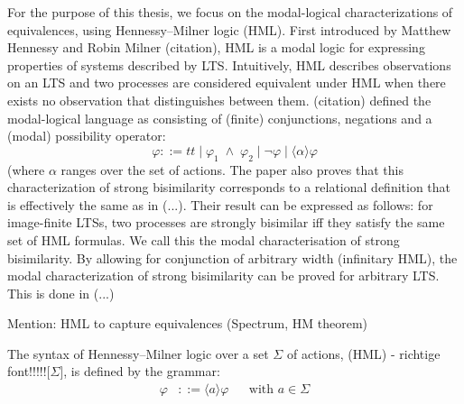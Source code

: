 %
\begin{isabellebody}%
%
%
\isadelimtheory
%
\endisadelimtheory
%
\isatagtheory
%
\endisatagtheory
{\isafoldtheory}%
%
\isadelimtheory
%
\endisadelimtheory
%
\isadelimdocument
%
\endisadelimdocument
%
\isatagdocument
%
\isamarkuptrue%
%
\endisatagdocument
{\isafolddocument}%
%
\isadelimdocument
%
\endisadelimdocument
%
\begin{isamarkuptext}%
For the purpose of this thesis, we focus on the modal-logical characterizations of equivalences, using Hennessy--Milner logic (HML). 
First introduced by Matthew Hennessy and Robin Milner (citation), HML is a modal logic for expressing properties of systems described by LTS.
Intuitively, HML describes observations on an LTS and two processes are considered equivalent under HML when there exists no observation that distinguishes between them.
(citation) defined the modal-logical language as consisting of (finite) conjunctions, negations and a (modal) possibility operator:
$$\varphi ::= t\!t \mid \varphi_1 \;\wedge\; \varphi_2 \mid \neg\varphi \mid \langle\alpha\rangle\varphi$$
(where $\alpha$ ranges over the set of actions. The paper also proves that this characterization of strong bisimilarity
corresponds to a relational definition that is effectively the same as in (...). Their result can be expressed as follows:
for image-finite LTSs, two processes are strongly bisimilar iff they satisfy the same set of HML formulas. We call this the modal characterisation of
strong bisimilarity. By allowing for conjunction of arbitrary width (infinitary HML), the modal characterization of strong bisimilarity can be proved for arbitrary LTS. This is done in (...)%
\end{isamarkuptext}\isamarkuptrue%
%
\begin{isamarkuptext}%
Mention: HML to capture equivalences (Spectrum, HM theorem)%
\end{isamarkuptext}\isamarkuptrue%
%
\isadelimdocument
%
\endisadelimdocument
%
\isatagdocument
%
\isamarkuptrue%
%
\endisatagdocument
{\isafolddocument}%
%
\isadelimdocument
%
\endisadelimdocument
%
\begin{isamarkuptext}%
The syntax of Hennessy--Milner logic over a set $\Sigma$ of actions, (HML) - richtige font!!!!![$\Sigma$], is defined by the grammar:
\begin{align*}
    \varphi &::= \langle a \rangle \varphi && \text{with } a \in \Sigma \\

\end{align*}
\end{isamarkuptext}
\end{isabellebody}
